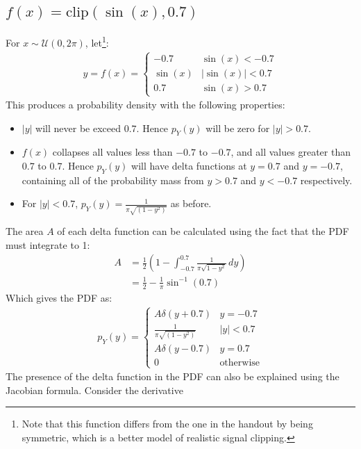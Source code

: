 \documentclass[a4paper]{article}
\begin{document}
\subsection{$f(x) = \text{clip}(\sin(x), 0.7)$}
For $x \sim \mathcal{U}(0, 2\pi)$, let\footnote{Note that this function differs from the one in the handout by being symmetric, which is a better model of realistic
signal clipping.}:
\begin{align*}
    y = f(x) = \begin{cases}
                   -0.7 & \sin(x) < -0.7 \\
                   \sin(x) & |\sin(x)| < 0.7 \\
                   0.7 & \sin(x) > 0.7
               \end{cases}
\end{align*}
This produces a probability density with the following properties:
\begin{itemize}
    \item $|y|$ will never be exceed $0.7$. Hence $p_Y(y)$ will be zero for $|y| > 0.7$.
    \item $f(x)$ collapses all values less than $-0.7$ to $-0.7$, and all values greater than $0.7$ to $0.7$. Hence
          $p_Y(y)$ will have delta functions at $y = 0.7$ and $y = -0.7$, containing all of the probability mass
          from $y > 0.7$ and $y < -0.7$ respectively.
    \item For $|y| < 0.7$, $p_Y(y) = \frac{1}{\pi \sqrt{\left(1- y^2\right)}}$ as before.
\end{itemize}
The area $A$ of each delta function can be calculated using the fact that the PDF must integrate to 1:
\begin{align*}
    A &= \frac{1}{2}\left(1 - \int_{-0.7}^{0.7} \frac{1}{\pi\sqrt{1 - y^2}}\,dy \right) \\
    &= \frac{1}{2} - \frac{1}{\pi} \sin^{-1}(0.7)
\end{align*}
Which gives the PDF as:
\begin{align*}
    p_Y(y) = \begin{cases}
                 A \delta(y + 0.7) & y = -0.7 \\
                 \frac{1}{\pi \sqrt{\left(1- y^2\right)}} & |y| < 0.7 \\
                 A \delta(y - 0.7) & y = 0.7 \\
                 0 & \text{otherwise}
             \end{cases}
\end{align*}
The presence of the delta function in the PDF can also be explained using the Jacobian formula. Consider the derivative
\end{document}
